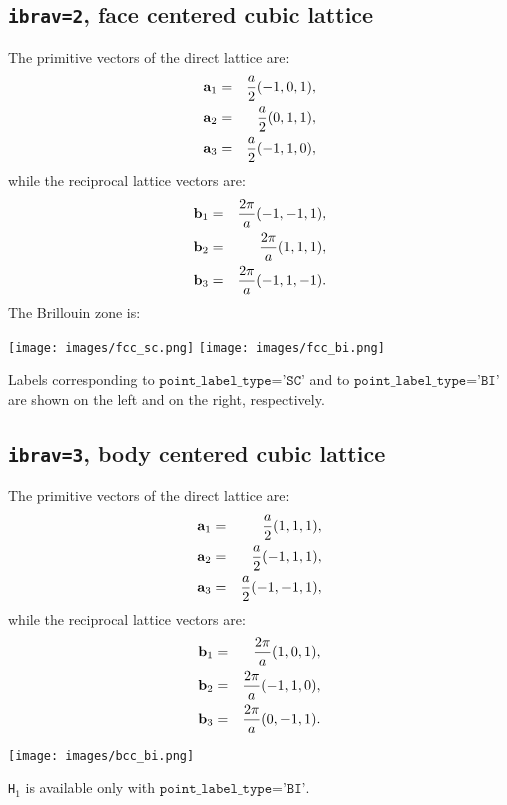 \documentclass[12pt,a4paper]{article}
\begin{document}
\subsection{\texttt{ibrav=2}, face centered cubic lattice}
The primitive vectors of the direct lattice are:
\begin{eqnarray}
{\bf a}_1 &=& {a \over 2} (-1, 0, 1), \nonumber \\
{\bf a}_2 &=& {a \over 2} (0, 1, 1), \nonumber \\
{\bf a}_3 &=& {a \over 2} (-1, 1, 0), \nonumber
\nonumber
\end{eqnarray}
while the reciprocal lattice vectors are:
\begin{eqnarray}
{\bf b}_1 &=& {2\pi \over a} (-1, -1, 1), \nonumber \\
{\bf b}_2 &=& {2\pi \over a} (1, 1, 1), \nonumber \\
{\bf b}_3 &=& {2\pi \over a} (-1, 1, -1). \nonumber
\nonumber
\end{eqnarray}
The Brillouin zone is:
\begin{center}
\texttt{[image: images/fcc\_sc.png]} \hspace{1.cm}
\texttt{[image: images/fcc\_bi.png]}
\end{center}
Labels corresponding to $\texttt{point\_label\_type='SC'}$ and to
$\texttt{point\_label\_type='BI'}$ are shown on the left and on the right, 
respectively.

\subsection{\texttt{ibrav=3}, body centered cubic lattice}

The primitive vectors of the direct lattice are:
\begin{eqnarray}
{\bf a}_1 &=&{a \over 2} (1, 1, 1), \nonumber \\
{\bf a}_2 &=&{a \over 2} (-1, 1, 1), \nonumber \\
{\bf a}_3 &=&{a \over 2} (-1, -1, 1), \nonumber
\nonumber
\end{eqnarray}
while the reciprocal lattice vectors are:
\begin{eqnarray}
{\bf b}_1 &=&{2\pi \over a} (1, 0, 1), \nonumber \\
{\bf b}_2 &=&{2\pi \over a} (-1, 1, 0), \nonumber \\
{\bf b}_3 &=&{2\pi \over a} (0, -1, 1). \nonumber
\nonumber
\end{eqnarray}
\begin{center}
\texttt{[image: images/bcc\_bi.png]}
\end{center}
\texttt{H$_1$} is available only with $\texttt{point\_label\_type='BI'}$.
\end{document}
